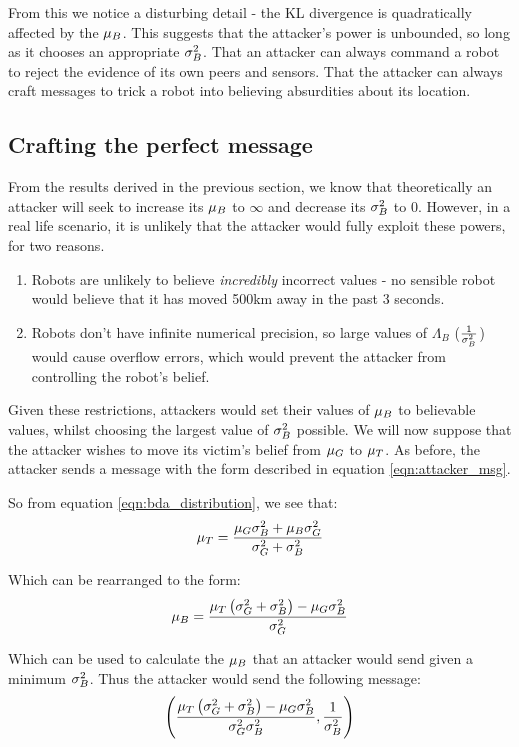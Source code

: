 From this we notice a disturbing detail - the KL divergence is quadratically affected by the $\mu_B$. This suggests that the attacker's power is unbounded, so long as it chooses an appropriate $\sigma_B^2$. That an attacker can always command a robot to reject the evidence of its own peers and sensors. That the attacker can always craft messages to trick a robot into believing absurdities about its location.

\subsection{Crafting the perfect message}
From the results derived in the previous section, we know that theoretically an attacker will seek to increase its $\mu_B$ to $\infty$ and decrease its $\sigma_B^2$ to 0. However, in a real life scenario, it is unlikely that the attacker would fully exploit these powers, for two reasons.
\begin{enumerate}
	\item Robots are unlikely to believe \textit{incredibly} incorrect values - no sensible robot would believe that it has moved 500km away in the past 3 seconds.
	\item Robots don't have infinite numerical precision, so large values of $\Lambda_B$ ($\frac{1}{\sigma_B^2}$) would cause overflow errors, which would prevent the attacker from controlling the robot's belief.
\end{enumerate}

Given these restrictions, attackers would set their values of $\mu_B$ to believable values, whilst choosing the largest value of $\sigma_B^2$ possible. 
We will now suppose that the attacker wishes to move its victim's belief from $\mu_G$ to $\mu_T$. 
As before, the attacker sends a message with the form described in equation \ref{eqn:attacker_msg}.

So from equation \ref{eqn:bda_distribution}, we see that:
\begin{equation}
	\mu_T = \frac{\mu_G\sigma_B^2 + \mu_B\sigma_G^2}{\sigma_G^2 + \sigma_B^2}
\end{equation}

Which can be rearranged to the form:
\begin{equation}
	\mu_B = \frac{\mu_T\left(\sigma_G^2 + \sigma_B^2\right) - \mu_G\sigma_B^2}{\sigma_G^2}
\end{equation}

Which can be used to calculate the $\mu_B$ that an attacker would send given a minimum $\sigma_B^2$. 
Thus the attacker would send the following message:
\begin{equation}
	\left(\frac{\mu_T\left(\sigma_G^2 + \sigma_B^2\right) - \mu_G\sigma_B^2}{\sigma_G^2\sigma_B^2}, \frac{1}{\sigma_B^2}\right)
\end{equation}

